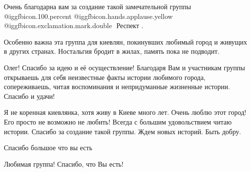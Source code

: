 \begin{itemize}
Очень благодарна вам за создание такой замечательной группы
@igg{fbicon.100.percent}  @igg{fbicon.hands.applause.yellow}
@igg{fbicon.exclamation.mark.double} ️  Респект .


Особенно важна эта группа для киевлян, покинувших любимый город и живущих в
других странах. Ностальгия бродит в жилах, память пока не подводит.


Олег! Спасибо за идею и её осуществление! Благодаря Вам и участникам группы
открываешь для себя неизвестные факты истории любимого города, сопереживаешь,
читая воспоминания и непридуманные жизненные истории. Спасибо и удачи!


Я не коренная киевлянка, хотя живу в Киеве много лет. Очень люблю этот город! Его
просто не возможно не любить! Всегда с большим удовольствием читаю
истории. Спасибо за создание такой группы. Ждем новых историй. Быть добру.

Спасибо большое что вы есть

Любимая группа! Спасибо, что Вы есть!


\end{itemize} %
